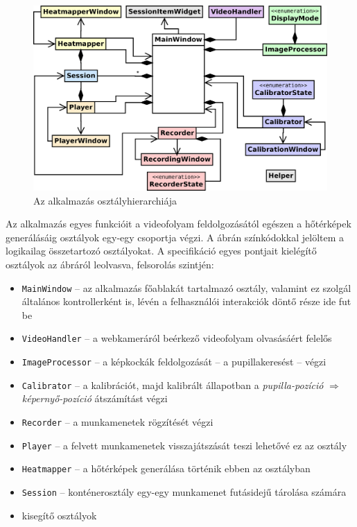 \begin{figure}[!ht]
\centering
\includegraphics[width=140mm, keepaspectratio]{figures/overview_aa.png}
\caption{Az alkalmazás osztályhierarchiája}
\label{fig:overview}
\end{figure}

Az alkalmazás egyes funkcióit a videofolyam feldolgozásától egészen a hőtérképek generálásáig osztályok egy-egy csoportja végzi. A  ábrán színkódokkal jelöltem a logikailag összetartozó osztályokat. A specifikáció egyes pontjait kielégítő osztályok az ábráról leolvasva, felsorolás szintjén:

\begin{itemize}
  \item \texttt{MainWindow} -- az alkalmazás főablakát tartalmazó osztály, valamint ez szolgál általános kontrollerként is, lévén a felhasználói interakciók döntő része ide fut be
  \item \texttt{VideoHandler} -- a webkameráról beérkező videofolyam olvasásáért felelős
  \item \texttt{ImageProcessor} -- a képkockák feldolgozását -- a pupillakeresést -- végzi
  \item \texttt{Calibrator} -- a kalibrációt, majd kalibrált állapotban a \emph{pupilla-pozíció} $\Longrightarrow$ \emph{képernyő-pozíció} átszámítást végzi
  \item \texttt{Recorder} -- a munkamenetek rögzítését végzi
  \item \texttt{Player} -- a felvett munkamenetek visszajátszását teszi lehetővé ez az osztály
  \item \texttt{Heatmapper} -- a hőtérképek generálása történik ebben az osztályban
  \item \texttt{Session} -- konténerosztály egy-egy munkamenet futásidejű tárolása számára
  \item kisegítő osztályok
\end{itemize}

